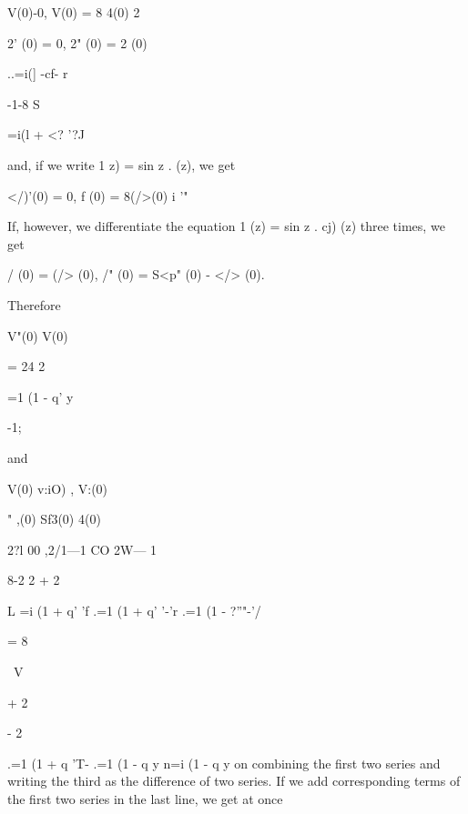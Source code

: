 V(0)-0, V(0) = 8 4(0) 2 



 2' (0) = 0,  2" (0) =  2 (0) 



..=i(] -cf- r 



-1-8 S 



 =i(l + <? '?J 



and, if we write  1  z) = sin z .   (z), we get 

</)'(0) = 0, f (0) = 8(/>(0) i  '" 

If, however, we differentiate the equation  1 (z) = sin z . cj) (z) three times, 
we get 



 / (0) = (/> (0),  /" (0) = S<p" (0) - </> (0). 



Therefore 



V"(0) 
V(0) 



= 24 2 



=1 (1 - q' y 



-1; 



and 



V(0) v:iO) , V:(0) 

" ,(0)   Sf3(0)  4(0) 



 2?l 00  ,2/1—1 CO  2W— 1 



8-2   2   + 2   

L  =i (1 + q' 'f .=1 (1 + q' '-'r .=1 (1 - ?''"-'/ 



= 8 



\  V 



+ 2 



- 2 



.=1 (1 + q 'T- .=1 (1 - q y n=i (1 - q y 
on combining the first two series and writing the third as the difference of 
two series. If we add corresponding terms of the first two series in the last 
line, we get at once 

